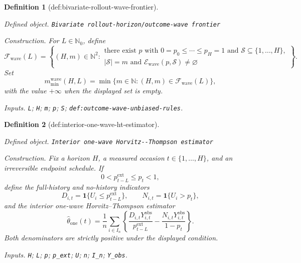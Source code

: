 \documentclass{article}
\newtheorem{definition}{Definition}
\begin{document}
\begin{definition}[def:bivariate-rollout-wave-frontier]\label{def:bivariate-rollout-wave-frontier}
\par\smallskip\noindent\emph{Defined object.} \texttt{Bivariate rollout-\allowbreak{}horizon/\allowbreak{}outcome-\allowbreak{}wave frontier}
\par\smallskip\noindent\emph{Construction.} For \(L\in\mathbb N_0\), define
\[
 \mathcal F_{\mathrm{wave}}(L)
 =\left\{(H,m)\in\mathbb N^2:
 \begin{array}{l}
 \text{there exist }p\text{ with }0=p_0\leq\cdots\leq p_H=1
 \text{ and }\mathcal S\subseteq\{1,\ldots,H\},\\
 |\mathcal S|=m\text{ and }\mathcal E_{\mathrm{wave}}(p,\mathcal S)\ne\varnothing
 \end{array}
 \right\}.
\]
Set
\[
 m_{\min}^{\mathrm{wave}}(H,L)
 =\min\{m\in\mathbb N:(H,m)\in\mathcal F_{\mathrm{wave}}(L)\},
\]
with the value \(+\infty\) when the displayed set is empty.
\par\smallskip\noindent\emph{Inputs.} \texttt{L}; \texttt{H}; \texttt{m}; \texttt{p}; \texttt{S}; \texttt{def:\allowbreak{}outcome-\allowbreak{}wave-\allowbreak{}unbiased-\allowbreak{}rules}.
\end{definition}

\begin{definition}[def:interior-one-wave-ht-estimator]\label{def:interior-one-wave-ht-estimator}
\par\smallskip\noindent\emph{Defined object.} \texttt{Interior one-\allowbreak{}wave Horvitz-\allowbreak{}-\allowbreak{}Thompson estimator}
\par\smallskip\noindent\emph{Construction.} Fix a horizon \(H\), a measured occasion \(t\in\{1,\ldots,H\}\), and an irreversible endpoint schedule.  If
\[
 0<p^{\mathrm{ext}}_{t-L}\leq p_t<1,
\]
define the full-history and no-history indicators
\[
 D_{i,t}=\mathbf 1\{U_i\leq p^{\mathrm{ext}}_{t-L}\},
 \qquad
 N_{i,t}=\mathbf 1\{U_i>p_t\},
\]
and the interior one-wave Horvitz--Thompson estimator
\[
 \widehat\theta_{\mathrm{one}}(t)
 =\frac1n\sum_{i\in I_n}
 \left\{
 \frac{D_{i,t}Y^{\mathrm{obs}}_{i,t}}{p^{\mathrm{ext}}_{t-L}}
 -\frac{N_{i,t}Y^{\mathrm{obs}}_{i,t}}{1-p_t}
 \right\}.
\]
Both denominators are strictly positive under the displayed condition.
\par\smallskip\noindent\emph{Inputs.} \texttt{H}; \texttt{L}; \texttt{p}; \texttt{p\_\allowbreak{}ext}; \texttt{U}; \texttt{n}; \texttt{I\_\allowbreak{}n}; \texttt{Y\_\allowbreak{}obs}.
\end{definition}
\end{document}
